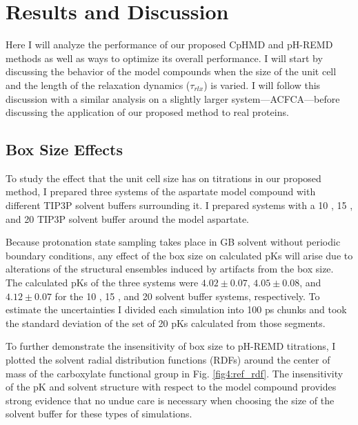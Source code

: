 \section{Results and Discussion}

Here I will analyze the performance of our proposed CpHMD and pH-REMD methods
as well as ways to optimize its overall performance. I will start by discussing
the behavior of the model compounds when the size of the unit cell and the
length of the relaxation dynamics ($\tau _ {rlx}$) is varied. I will follow
this discussion with a similar analysis on a slightly larger
system---ACFCA---before discussing the application of our proposed method to
real proteins.

\subsection{Box Size Effects}

To study the effect that the unit cell size has on titrations in our proposed
method, I prepared three systems of the aspartate model compound with different
TIP3P solvent buffers surrounding it. I prepared systems with a 10 \text{\AA},
15 \text{\AA}, and 20 \text{\AA} TIP3P solvent buffer around the model
aspartate.

Because protonation state sampling takes place in GB solvent without periodic
boundary conditions, any effect of the box size on calculated pKs will
arise due to alterations of the structural ensembles induced by artifacts from
the box size. The calculated pKs of the three systems were $4.02 \pm
0.07$, $4.05 \pm 0.08$, and $4.12 \pm 0.07$ for the 10 \text{\AA}, 15
\text{\AA}, and 20 \text{\AA} solvent buffer systems, respectively. To estimate
the uncertainties I divided each simulation into 100 ps chunks and took the
standard deviation of the set of 20 pKs calculated from those segments.

To further demonstrate the insensitivity of box size to pH-REMD titrations, I
plotted the solvent radial distribution functions (RDFs) around the center of
mass of the carboxylate functional group in Fig. \ref{fig4:ref_rdf}. The
insensitivity of the pK and solvent structure with respect to the model
compound provides strong evidence that no undue care is necessary when choosing
the size of the solvent buffer for these types of simulations.

